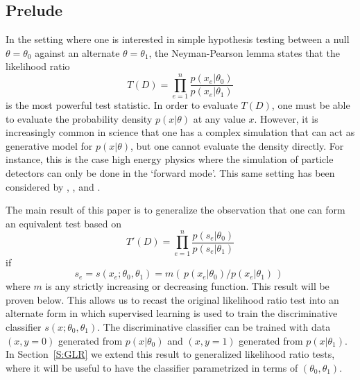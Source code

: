 \documentclass[aoas,preprint]{imsart}
\numberwithin{equation}{section}
\theoremstyle{plain}
\begin{document}
\subsection{Prelude}

In the setting where one is interested in simple hypothesis testing between a null $\theta=\theta_0$ against an alternate $\theta=\theta_1$, the Neyman-Pearson lemma states that the likelihood ratio 
\begin{equation}
T(D) = \prod_{e=1}^n \frac{ p(x_e|\theta_0)}{ p(x_e|\theta_1)}
\end{equation}
is the most powerful test statistic. In order to evaluate $T(D)$, one must be able to evaluate the probability density 
$p(x| \theta)$ at any value $x$. However, it is increasingly common in science that one has a complex simulation that 
can act as generative model  for $p(x|\theta)$, but one cannot evaluate the density directly. For instance, this is the case 
high energy physics where the simulation of particle detectors can only be done in the `forward mode'. This same setting has been considered by \cite{ClaytonScott}, \cite{JMLR:v14:tong13a}, and \cite{Neal:2007zz}.

The main result of this paper is to generalize the observation that one can form an equivalent test based on 
\begin{equation}\label{eq:equivLRtest}
T'(D) = \prod_{e=1}^n \frac{ p(s_e | \theta_0)}{ p(s_e | \theta_1)}
\end{equation}
if 
\begin{equation}\label{eq:montonic}
s_e = s(x_e; \theta_0, \theta_1) = m\left(\, p(x_e|\theta_0) / p(x_e|\theta_1) \,\right) \; 
\end{equation}
where $m$ is any strictly increasing or decreasing function. This result will be proven below.
This allows us to recast the original likelihood ratio test into an alternate form in which supervised learning is used to train the discriminative classifier $s(x; \theta_0, \theta_1)$. The discriminative classifier can be trained with data $(x,y=0)$ generated 
from $p(x|\theta_0)$ and $(x,y=1)$ generated from $p(x|\theta_1)$. In Section~\ref{S:GLR} we extend this result to generalized likelihood ratio tests, where it will be useful to have the classifier  parametrized in terms of $(\theta_0, \theta_1)$.
\end{document}
